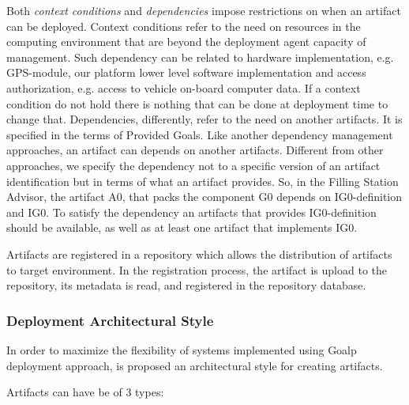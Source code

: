 Both \emph{context conditions} and \emph{dependencies} impose restrictions on when an artifact can be deployed.
Context conditions refer to the need on resources in the computing environment that are beyond the deployment agent capacity of management. Such dependency can be related to hardware implementation, e.g. GPS-module, our platform lower level software implementation and access authorization, e.g. access to vehicle on-board computer data. If a context condition do not hold there is nothing that can be done at deployment time to change that.
Dependencies, differently, refer to the need on another artifacts. It is specified in the terms of Provided Goals. Like another dependency management approaches, an artifact can depends on another artifacts.
Different from other approaches, we specify the dependency not to a specific version of an artifact identification but in terms of what an artifact provides.
So, in the Filling Station Advisor, the artifact A0, that packs the component G0 depends on IG0-definition and IG0. To satisfy the dependency an artifacts that provides IG0-definition should be available, as well as at least one artifact that implements IG0.

Artifacts are registered in a repository which allows the distribution of artifacts to target environment. In the registration process, the artifact is upload to the repository, its metadata is read, and registered in the repository database.

\subsubsection{Deployment Architectural Style}
\label{depl_arch_style}

In order to maximize the flexibility of systems implemented using Goalp deployment approach, is proposed an architectural style for creating artifacts.

Artifacts can have be of 3 types:

